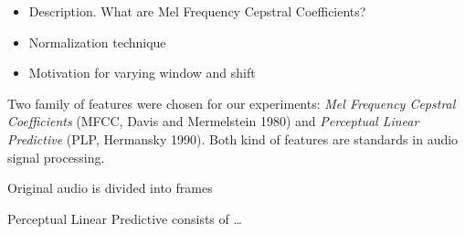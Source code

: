 \begin{itemize}
	\item Description. What are Mel Frequency Cepstral Coefficients?
	\item Normalization technique
	\item Motivation for varying window and shift
\end{itemize}

Two family of features were chosen for our experiments: \textit{Mel Frequency Cepstral Coefficients}
(MFCC, Davis and Mermelstein 1980) and \textit{Perceptual Linear Predictive} 
(PLP, Hermansky 1990). Both kind of features are standards in audio signal processing.

Original audio is divided into frames 

Perceptual Linear Predictive consists of \ldots
